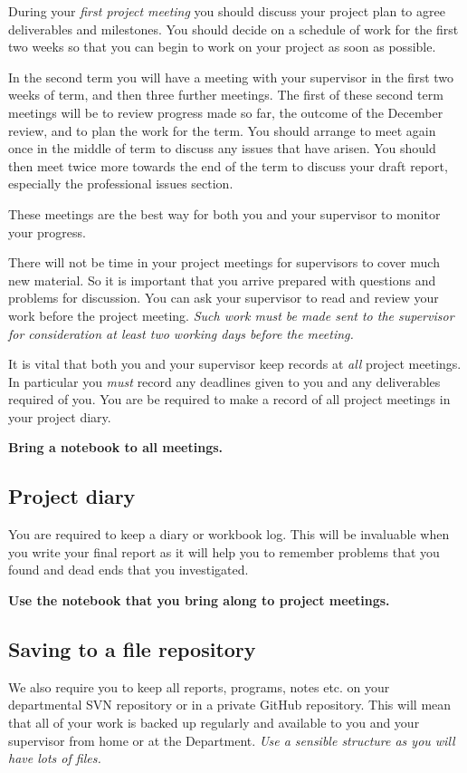 \documentclass[11pt]{article}
\begin{document}
During your \emph{first project meeting} you should discuss your project plan to agree deliverables and milestones.  You should decide on a schedule of work for the first two weeks so that you can begin to work on your project as soon as possible.

In the second term you will have a meeting with your supervisor in the first two weeks of term, and then three further meetings.  The first of these second term meetings will be to review progress made so far, the outcome of the December review, and to plan the work for the term.  You should arrange to meet again once in the middle of term to discuss any issues that have arisen.  You should then meet twice more towards the end of the term to discuss your draft report, especially the professional issues section.

These meetings are the best way for both you and your supervisor to monitor your progress.

There will not be time in your project meetings for supervisors to cover much new material.  So it is important that you arrive prepared with questions and problems for discussion. You can ask your supervisor to read and review your work before the project meeting.  \emph{Such work must be made sent to the supervisor for consideration at least two working days before the meeting. }

It is vital that both you and your supervisor keep records at \textit{all} project meetings. In particular you \textit{must} record any deadlines given to you and any deliverables required of you.  You are be required to make a record of all project meetings in your project diary.
\begin{center}\textbf{Bring a notebook to all meetings.}\end{center}

\subsection{Project diary}
You are required  to keep a diary or workbook log. This will be invaluable when you write your final report as it will help you to remember problems that you found and dead ends that you investigated.

\begin{center}
\textbf{Use the notebook that you bring along to project meetings.}
\end{center}

\subsection{Saving to a file repository}
We also require you to keep all reports, programs, notes etc. on your departmental SVN repository or in a private GitHub repository.  This will mean that all of your work is backed up regularly and available to you and your supervisor from home or at the Department.   \emph{Use a sensible structure as you will have lots of files.}
\end{document}
